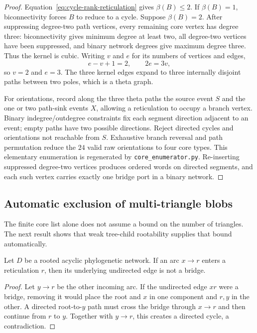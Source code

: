 \begin{proof}
Equation~\eqref{eq:cycle-rank-reticulation} gives $\beta(B)\le2$.  If $\beta(B)=1$, biconnectivity forces $B$ to reduce to a cycle.  Suppose $\beta(B)=2$.  After suppressing degree-two path vertices, every remaining core vertex has degree three: biconnectivity gives minimum degree at least two, all degree-two vertices have been suppressed, and binary network degrees give maximum degree three.  Thus the kernel is cubic.  Writing $v$ and $e$ for its numbers of vertices and edges,
\[
e-v+1=2,
\qquad
2e=3v,
\]
so $v=2$ and $e=3$.  The three kernel edges expand to three internally disjoint paths between two poles, which is a theta graph.

For orientations, record along the three theta paths the source event $S$ and the one or two path-sink events $X$, allowing a reticulation to occupy a branch vertex.  Binary indegree/outdegree constraints fix each segment direction adjacent to an event; empty paths have two possible directions.  Reject directed cycles and orientations not reachable from $S$.  Exhaustive branch reversal and path permutation reduce the $24$ valid raw orientations to four core types.  This elementary enumeration is regenerated by \texttt{core\_enumerator.py}.  Re-inserting suppressed degree-two vertices produces ordered words on directed segments, and each such vertex carries exactly one bridge port in a binary network.
\end{proof}



\subsection{Automatic exclusion of multi-triangle blobs}\label{sec:automatic-triangle}

The finite core list alone does not assume a bound on the number of triangles.  The next result shows that weak tree-child rootability supplies that bound automatically.

\begin{lemma}\label{lem:no-incoming-retic-bridge}
Let $D$ be a rooted acyclic phylogenetic network.  If an arc $x\to r$ enters a reticulation $r$, then its underlying undirected edge is not a bridge.
\end{lemma}

\begin{proof}
Let $y\to r$ be the other incoming arc.  If the undirected edge $xr$ were a bridge, removing it would place the root and $x$ in one component and $r,y$ in the other.  A directed root-to-$y$ path must cross the bridge through $x\to r$ and then continue from $r$ to $y$.  Together with $y\to r$, this creates a directed cycle, a contradiction.
\end{proof}

